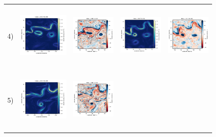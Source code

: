 \begin{figure}[h!]
\begin{center}
\begin{tabular}{ccccc}
\hspace{-10mm} 4) &
 \includegraphics[trim={0 13mm 22mm 5mm},clip, width=3.60cm,height=3.2cm]{figures/plots/natl60_train_ke.png} &
 \includegraphics[trim={13mm 13mm 22mm 5mm},clip, width=3.2cm,height=3.2cm]{figures/plots/natl60_train_vort_r.png} &
 \includegraphics[trim={13mm 13mm 22mm 5mm},clip, width=3.2cm,height=3.2cm]{figures/plots/natl60_rec_ke.png} &
 \includegraphics[trim={13mm 13mm 22mm 5mm},clip,width=3.2cm,height=3.2cm]{figures/plots/natl60_rec_vort_r.png} \\
\hspace{-10mm} 5) &
\includegraphics[trim={0 13mm 22mm 5mm},clip, width=3.60cm,height=3.2cm]{figures/plots/enatl60-t_train_ke.png} &
\includegraphics[trim={13mm 13mm 22mm 5mm},clip, width=3.2cm,height=3.2cm]{figures/plots/enatl60-t_train_vort_r.png} &

\end{tabular}
\end{center}
\end{figure}
